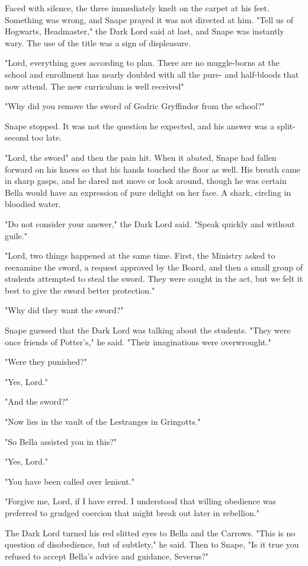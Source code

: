Faced with silence, the three immediately knelt on the carpet at his feet. Something was wrong, and Snape prayed it was not directed at him. "Tell us of Hogwarts, Headmaster," the Dark Lord said at last, and Snape was instantly wary. The use of the title was a sign of displeasure.

"Lord, everything goes according to plan. There are no muggle-borns at the school and enrollment has nearly doubled with all the pure- and half-bloods that now attend. The new curriculum is well received{\el}"

"Why did you remove the sword of Godric Gryffindor from the school?"

Snape stopped. It was not the question he expected, and his answer was a split-second too late.

"Lord, the sword{\el}" and then the pain hit. When it abated, Snape had fallen forward on his knees so that his hands touched the floor as well. His breath came in sharp gasps, and he dared not move or look around, though he was certain Bella would have an expression of pure delight on her face. A shark, circling in bloodied water.

"Do not consider your answer," the Dark Lord said. "Speak quickly and without guile."

"Lord, two things happened at the same time. First, the Ministry asked to reexamine the sword, a request approved by the Board, and then a small group of students attempted to steal the sword. They were caught in the act, but we felt it best to give the sword better protection."

"Why did they want the sword?"

Snape guessed that the Dark Lord was talking about the students. "They were once friends of Potter's," he said. "Their imaginations were overwrought."

"Were they punished?"

"Yes, Lord."

"And the sword?"

"Now lies in the vault of the Lestranges in Gringotts."

"So Bella assisted you in this?"

"Yes, Lord."

"You have been called over lenient."

"Forgive me, Lord, if I have erred. I understood that willing obedience was preferred to grudged coercion that might break out later in rebellion."

The Dark Lord turned his red slitted eyes to Bella and the Carrows. "This is no question of disobedience, but of subtlety," he said. Then to Snape, "Is it true you refused to accept Bella's advice and guidance, Severus?"

